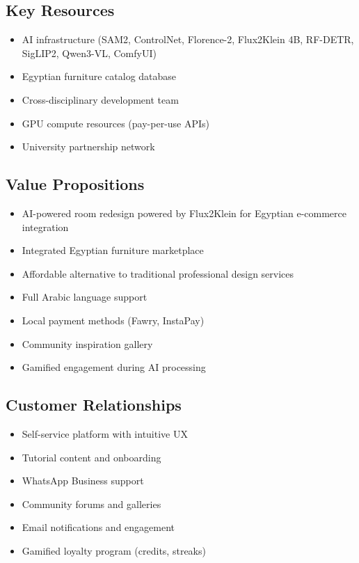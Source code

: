 \subsection{Key Resources}

\begin{itemize}
    \item AI infrastructure (SAM2, ControlNet, Florence-2, Flux2Klein 4B, RF-DETR, SigLIP2, Qwen3-VL, ComfyUI)
    \item Egyptian furniture catalog database
    \item Cross-disciplinary development team
    \item GPU compute resources (pay-per-use APIs)
    \item University partnership network
\end{itemize}

\subsection{Value Propositions}

\begin{itemize}
    \item AI-powered room redesign powered by Flux2Klein for Egyptian e-commerce integration
    \item Integrated Egyptian furniture marketplace
    \item Affordable alternative to traditional professional design services
    \item Full Arabic language support
    \item Local payment methods (Fawry, InstaPay)
    \item Community inspiration gallery
    \item Gamified engagement during AI processing
\end{itemize}

\subsection{Customer Relationships}

\begin{itemize}
    \item Self-service platform with intuitive UX
    \item Tutorial content and onboarding
    \item WhatsApp Business support
    \item Community forums and galleries
    \item Email notifications and engagement
    \item Gamified loyalty program (credits, streaks)
\end{itemize}

